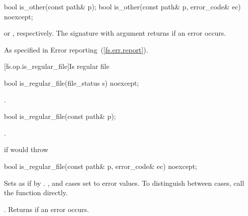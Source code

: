 \begin{itemdecl}
bool is_other(const path& p);
bool is_other(const path& p, error_code& ec) noexcept;
\end{itemdecl}

\begin{itemdescr}
\pnum
\returns {} or ,
  respectively. The signature with argument  returns 
  if an error occurs.

\pnum
\throws As specified in Error reporting~(\ref{fs.err.report}).
\end{itemdescr}


[fs.op.is_regular_file]{Is regular file}

\begin{itemdecl}
bool is_regular_file(file_status s) noexcept;
\end{itemdecl}

\begin{itemdescr}
\pnum
\returns {}.
\end{itemdescr}

\begin{itemdecl}
bool is_regular_file(const path& p);
\end{itemdecl}

\begin{itemdescr}
\pnum
\returns {}.

\pnum
\throws {} if  would throw 
\end{itemdescr}

\begin{itemdecl}
bool is_regular_file(const path& p, error_code& ec) noexcept;
\end{itemdecl}

\begin{itemdescr}
\pnum
\effects Sets  as if by . \enternote
{},  and
   cases set  to error values. To distinguish between cases, call the  function directly. \exitnote

\pnum
\returns {}.
Returns  if an error occurs.
\end{itemdescr}


